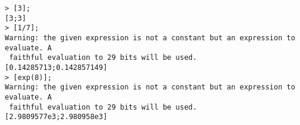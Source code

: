 \begin{center}\begin{minipage}{15cm}\begin{Verbatim}[frame=single]
> [3];
[3;3]
> [1/7];
Warning: the given expression is not a constant but an expression to evaluate. A
 faithful evaluation to 29 bits will be used.
[0.14285713;0.142857149]
> [exp(8)];
Warning: the given expression is not a constant but an expression to evaluate. A
 faithful evaluation to 29 bits will be used.
[2.9809577e3;2.980958e3]
\end{Verbatim}
\end{minipage}\end{center}
